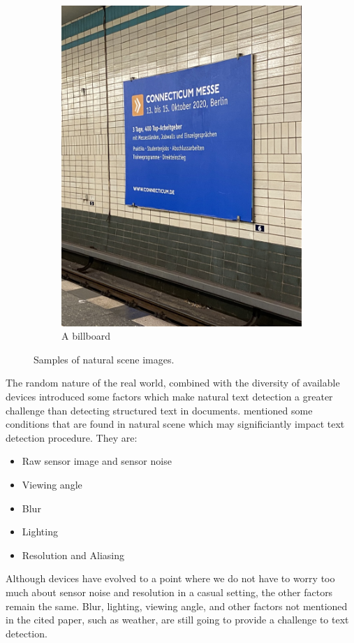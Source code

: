 \documentclass[a4paper]{article}
\begin{document}
\begin{figure}[h!]
\begin{subfigure}[b]{0.4\linewidth}
		\includegraphics[width=\linewidth]{img/sample3.jpeg}
		\caption{A billboard}
	  \end{subfigure}
	\caption{Samples of natural scene images.}
	\label{fig:samples}
  \end{figure}

The random nature of the real world, combined with the diversity of available devices introduced some factors which make natural text detection a greater challenge than detecting structured text in documents. \cite{NaturalScene} mentioned some conditions that are found in natural scene which may significiantly impact text detection procedure. They are:
\begin{itemize}
	\item Raw sensor image and sensor noise
	\item Viewing angle
	\item Blur
	\item Lighting
	\item Resolution and Aliasing
\end{itemize}
Although devices have evolved to a point where we do not have to worry too much about sensor noise and resolution in a casual setting, the other factors remain the same. Blur, lighting, viewing angle, and other factors not mentioned in the cited paper, such as weather, are still going to provide a challenge to text detection.
\end{document}
